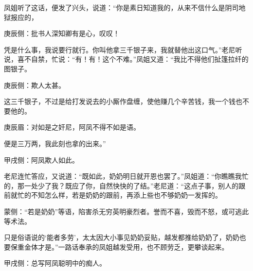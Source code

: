 \begin{parag}
    凤姐听了这话，便发了兴头，说道：“你是素日知道我的，从来不信什么是阴司地狱报应的，\begin{note}庚辰侧：批书人深知卿有是心，叹叹！\end{note}凭是什么事，我说要行就行。你叫他拿三千银子来，我就替他出这口气。”老尼听说，喜不自禁，忙说：“有！有！这个不难。”凤姐又道：“我比不得他们扯篷拉纤的图银子。\begin{note}庚辰侧：欺人太甚。\end{note}这三千银子，不过是给打发说去的小厮作盘缠，使他赚几个辛苦钱，我一个钱也不要他的。\begin{note}庚辰眉：对如是之奸尼，阿凤不得不如是语。\end{note}便是三万两，我此刻也拿的出来。”\begin{note}甲戌侧：阿凤欺人如此。\end{note}老尼连忙答应，又说道：“既如此，奶奶明日就开恩也罢了。”凤姐道：“你瞧瞧我忙的，那一处少了我？既应了你，自然快快的了结。”老尼道：“这点子事，别人的跟前就忙的不知怎么样，若是奶奶的跟前，再添上些也不够奶奶一发挥的。\begin{note}蒙侧：“若是奶奶”等语，陷害杀无穷英明豪烈者。誉而不喜，毁而不怒，或可逃此等术法。\end{note}只是俗语说的‘能者多劳’，太太因大小事见奶奶妥贴，越发都推给奶奶了，奶奶也要保重金体才是。”一路话奉承的凤姐越发受用，也不顾劳乏，更攀谈起来。\begin{note}甲戌侧：总写阿凤聪明中的痴人。\end{note}
\end{parag}


